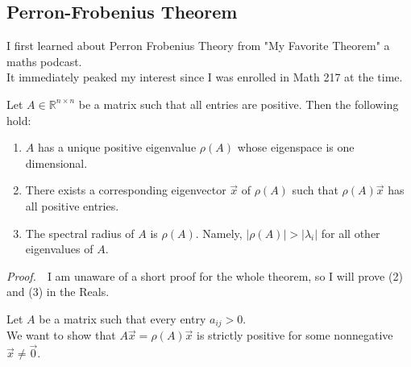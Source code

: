 \documentclass[12pt]{article}
\newcommand{\p}{{\it{Proof.}}}
\newcommand{\z}{\vec{0}}
\newcommand{\R}{\mathbb{R}}
\begin{document}
\author{DRP Application Response}
\date{\today}
\fancyhead{}







 



\vspace{1em}
\begin{center}
\section{Perron-Frobenius Theorem}\end{center}
\begin{center} I first learned about Perron Frobenius Theory from "My Favorite Theorem" a maths podcast.\\ It immediately peaked my interest since I was enrolled in Math 217 at the time.  \end{center}

\begin{tcolorbox}
	\begin{flushleft} Let $A \in \R^{n \times n}$ be a matrix such that all entries are positive. Then the following hold: \end{flushleft}
	\begin{enumerate}
	\item $A$ has a unique positive eigenvalue $\rho(A)$ whose eigenspace is one dimensional.
	\item  There exists a corresponding eigenvector $\vec{x}$ of $\rho(A)$ such that $\rho(A)\vec{x}$ has all positive entries.
	\item The spectral radius of $A$ is $\rho(A)$. Namely, $|\rho(A) | > |\lambda_i|$ for all other eigenvalues of $A$.
	\end{enumerate}
\end{tcolorbox}
	
	\p \ \ I am unaware of a short proof for the whole theorem, so I will prove (2) and (3) in the Reals. 
	
	Let $A$ be a matrix such that every entry $a_{ij} > 0 $.\\ 
	We want to show that  $A\vec{x} = \rho(A)\vec{x}$ is strictly positive for some nonnegative $\vec{x} \ne \z$. 
	
\end{document}
